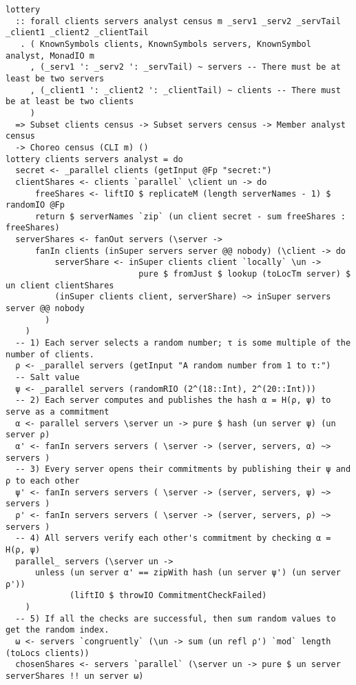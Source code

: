 \documentclass[sigplan,screen,review,anonymous]{acmart}
\begin{document}
\begin{figure*}
\begin{mdframed}
\begin{verbatim}
lottery
  :: forall clients servers analyst census m _serv1 _serv2 _servTail _client1 _client2 _clientTail
   . ( KnownSymbols clients, KnownSymbols servers, KnownSymbol analyst, MonadIO m
     , (_serv1 ': _serv2 ': _servTail) ~ servers -- There must be at least be two servers
     , (_client1 ': _client2 ': _clientTail) ~ clients -- There must be at least be two clients
     )
  => Subset clients census -> Subset servers census -> Member analyst census
  -> Choreo census (CLI m) ()
lottery clients servers analyst = do
  secret <- _parallel clients (getInput @Fp "secret:")
  clientShares <- clients `parallel` \client un -> do
      freeShares <- liftIO $ replicateM (length serverNames - 1) $ randomIO @Fp
      return $ serverNames `zip` (un client secret - sum freeShares : freeShares)
  serverShares <- fanOut servers (\server ->
      fanIn clients (inSuper servers server @@ nobody) (\client -> do
          serverShare <- inSuper clients client `locally` \un ->
                           pure $ fromJust $ lookup (toLocTm server) $ un client clientShares
          (inSuper clients client, serverShare) ~> inSuper servers server @@ nobody
        )
    )
  -- 1) Each server selects a random number; τ is some multiple of the number of clients.
  ρ <- _parallel servers (getInput "A random number from 1 to τ:")
  -- Salt value
  ψ <- _parallel servers (randomRIO (2^(18::Int), 2^(20::Int)))
  -- 2) Each server computes and publishes the hash α = H(ρ, ψ) to serve as a commitment
  α <- parallel servers \server un -> pure $ hash (un server ψ) (un server ρ)
  α' <- fanIn servers servers ( \server -> (server, servers, α) ~> servers )
  -- 3) Every server opens their commitments by publishing their ψ and ρ to each other
  ψ' <- fanIn servers servers ( \server -> (server, servers, ψ) ~> servers )
  ρ' <- fanIn servers servers ( \server -> (server, servers, ρ) ~> servers )
  -- 4) All servers verify each other's commitment by checking α = H(ρ, ψ)
  parallel_ servers (\server un ->
      unless (un server α' == zipWith hash (un server ψ') (un server ρ'))
             (liftIO $ throwIO CommitmentCheckFailed)
    )
  -- 5) If all the checks are successful, then sum random values to get the random index.
  ω <- servers `congruently` (\un -> sum (un refl ρ') `mod` length (toLocs clients))
  chosenShares <- servers `parallel` (\server un -> pure $ un server serverShares !! un server ω)

\end{verbatim}
\end{mdframed}
\end{figure*}
\end{document}

